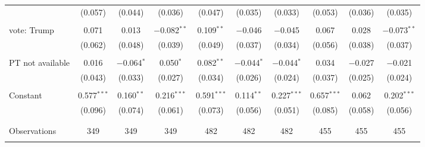 \begin{tabular}{@{\extracolsep{5pt}}lccccccccc}
  & (0.057) & (0.044) & (0.036) & (0.047) & (0.035) & (0.033) & (0.053) & (0.036) & (0.035) \\ 
  & & & & & & & & & \\ 
 vote: Trump & 0.071 & 0.013 & $-$0.082$^{**}$ & 0.109$^{**}$ & $-$0.046 & $-$0.045 & 0.067 & 0.028 & $-$0.073$^{**}$ \\ 
  & (0.062) & (0.048) & (0.039) & (0.049) & (0.037) & (0.034) & (0.056) & (0.038) & (0.037) \\ 
  & & & & & & & & & \\ 
 PT not available & 0.016 & $-$0.064$^{*}$ & 0.050$^{*}$ & 0.082$^{**}$ & $-$0.044$^{*}$ & $-$0.044$^{*}$ & 0.034 & $-$0.027 & $-$0.021 \\ 
  & (0.043) & (0.033) & (0.027) & (0.034) & (0.026) & (0.024) & (0.037) & (0.025) & (0.024) \\ 
  & & & & & & & & & \\ 
 Constant & 0.577$^{***}$ & 0.160$^{**}$ & 0.216$^{***}$ & 0.591$^{***}$ & 0.114$^{**}$ & 0.227$^{***}$ & 0.657$^{***}$ & 0.062 & 0.202$^{***}$ \\ 
  & (0.096) & (0.074) & (0.061) & (0.073) & (0.056) & (0.051) & (0.085) & (0.058) & (0.056) \\ 
  & & & & & & & & & \\ 
\hline \\[-1.8ex] 

Observations & 349 & 349 & 349 & 482 & 482 & 482 & 455 & 455 & 455 \\ 
\hline 
\hline \\[-1.8ex] 
\end{tabular} 